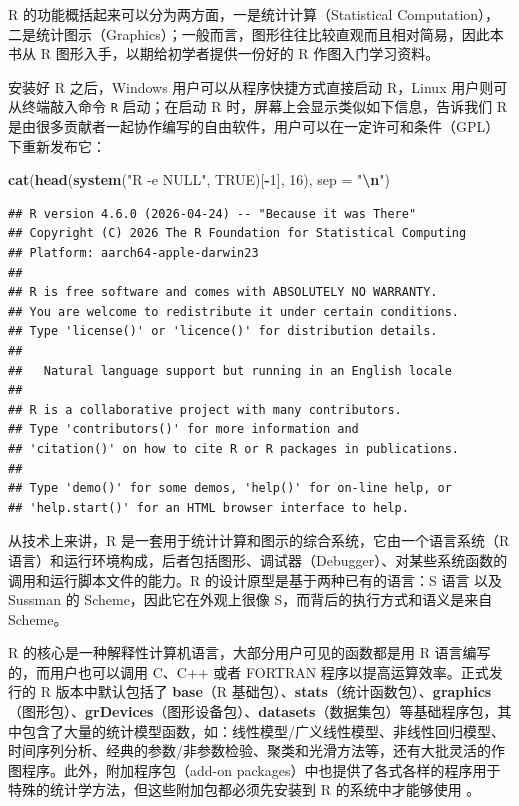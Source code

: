 \documentclass[
  b5paper,
  UTF8,twoside]{book}
\newenvironment{Shaded}{\begin{snugshade}}{\end{snugshade}}
\newcommand{\AttributeTok}[1]{\textcolor[rgb]{0.13,0.29,0.53}{#1}}
\newcommand{\ConstantTok}[1]{\textcolor[rgb]{0.56,0.35,0.01}{#1}}
\newcommand{\DecValTok}[1]{\textcolor[rgb]{0.00,0.00,0.81}{#1}}
\newcommand{\FunctionTok}[1]{\textcolor[rgb]{0.13,0.29,0.53}{\textbf{#1}}}
\newcommand{\NormalTok}[1]{#1}
\newcommand{\SpecialCharTok}[1]{\textcolor[rgb]{0.81,0.36,0.00}{\textbf{#1}}}
\newcommand{\StringTok}[1]{\textcolor[rgb]{0.31,0.60,0.02}{#1}}
\begin{document}
R 的功能概括起来可以分为两方面，一是统计计算（Statistical Computation），二是统计图示（Graphics）；一般而言，图形往往比较直观而且相对简易，因此本书从 R 图形入手，以期给初学者提供一份好的 R 作图入门学习资料。

安装好 R 之后，Windows 用户可以从程序快捷方式直接启动 R，Linux 用户则可从终端敲入命令 \texttt{R} 启动；在启动 R 时，屏幕上会显示类似如下信息，告诉我们 R 是由很多贡献者一起协作编写的自由软件，用户可以在一定许可和条件（GPL）下重新发布它：

\begin{Shaded}
\begin{Highlighting}[]
\FunctionTok{cat}\NormalTok{(}\FunctionTok{head}\NormalTok{(}\FunctionTok{system}\NormalTok{(}\StringTok{"R {-}e NULL"}\NormalTok{, }\ConstantTok{TRUE}\NormalTok{)[}\SpecialCharTok{{-}}\DecValTok{1}\NormalTok{], }\DecValTok{16}\NormalTok{), }\AttributeTok{sep =} \StringTok{"}\SpecialCharTok{\textbackslash{}n}\StringTok{"}\NormalTok{)}
\end{Highlighting}
\end{Shaded}

\begin{verbatim}
## R version 4.6.0 (2026-04-24) -- "Because it was There"
## Copyright (C) 2026 The R Foundation for Statistical Computing
## Platform: aarch64-apple-darwin23
## 
## R is free software and comes with ABSOLUTELY NO WARRANTY.
## You are welcome to redistribute it under certain conditions.
## Type 'license()' or 'licence()' for distribution details.
## 
##   Natural language support but running in an English locale
## 
## R is a collaborative project with many contributors.
## Type 'contributors()' for more information and
## 'citation()' on how to cite R or R packages in publications.
## 
## Type 'demo()' for some demos, 'help()' for on-line help, or
## 'help.start()' for an HTML browser interface to help.
\end{verbatim}

从技术上来讲，R 是一套用于统计计算和图示的综合系统，它由一个语言系统（R 语言）和运行环境构成，后者包括图形、调试器（Debugger）、对某些系统函数的调用和运行脚本文件的能力。R 的设计原型是基于两种已有的语言：S 语言 \citep{Becker88} 以及 Sussman 的 Scheme，因此它在外观上很像 S，而背后的执行方式和语义是来自 Scheme。

R 的核心是一种解释性计算机语言，大部分用户可见的函数都是用 R 语言编写的，而用户也可以调用 C、C++ 或者 FORTRAN 程序以提高运算效率。正式发行的 R 版本中默认包括了 \textbf{base}（R 基础包）、\textbf{stats}（统计函数包）、\textbf{graphics}（图形包）、\textbf{grDevices}（图形设备包）、\textbf{datasets}（数据集包）等基础程序包，其中包含了大量的统计模型函数，如：线性模型/广义线性模型、非线性回归模型、时间序列分析、经典的参数/非参数检验、聚类和光滑方法等，还有大批灵活的作图程序。此外，附加程序包（add-on
packages）中也提供了各式各样的程序用于特殊的统计学方法，但这些附加包都必须先安装到 R 的系统中才能够使用 \citep{Hornik-FAQ}。
\end{document}
